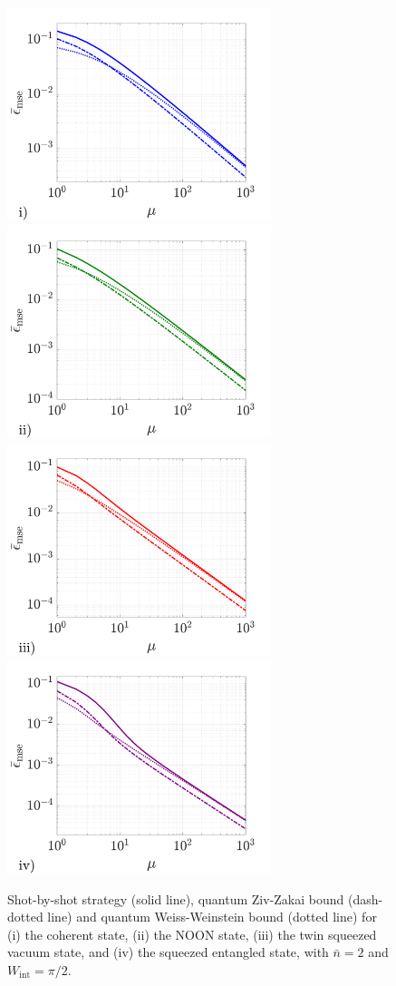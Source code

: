 \begin{figure}[t]
\centering
\includegraphics[trim={0.1cm 0.1cm 0.65cm 0.5cm},clip,width=7.7cm]{pictures/ch5_fig8i}\includegraphics[trim={0.1cm 0.1cm 0.65cm 0.5cm},clip,width=7.7cm]{pictures/ch5_fig8ii}
\includegraphics[trim={0.1cm 0.1cm 0.65cm 0.5cm},clip,width=7.7cm]{pictures/ch5_fig8iii}\includegraphics[trim={0.1cm 0.1cm 0.65cm 0.5cm},clip,width=7.7cm]{pictures/ch5_fig8iv}
\caption[Shot-by-shot bound versus Ziv-Zakai and Weiss-Weinstein]{Shot-by-shot strategy (solid line), quantum Ziv-Zakai bound (dash-dotted line) and quantum Weiss-Weinstein bound (dotted line) for (i) the coherent state, (ii) the NOON state, (iii) the twin squeezed vacuum state, and (iv) the squeezed entangled state, with $\bar{n} = 2$ and $W_{\mathrm{int}} = \pi/2$.}
\label{consistency}
\end{figure}


